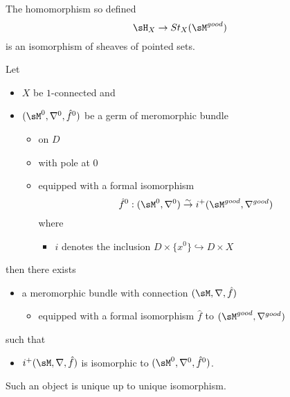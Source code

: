 \begin{thm}
  The homomorphism so defined
  \[
    \sH_X\to St_X(\sM^{good})
  \]
  is an isomorphism of sheaves of pointed sets.
\end{thm}
\begin{cor}
  Let
  \begin{itemize}
    \item $X$ be $1$-connected and
    \item $(\sM^0,\nabla^0,\hat f^0)$ be a germ of meromorphic bundle
      \begin{itemize}
        \item on $D$
        \item with pole at $0$
        \item equipped with a formal isomorphism
          \[
            \hat f^0:(\sM^0,\nabla^0)
              \overset{\sim}{\to}
              i^+(\sM^{good},\nabla^{good})
          \]
          where
          \begin{itemize}
            \item $i$ denotes the inclusion
              $D\times\{x^0\}\hookrightarrow D\times X$
          \end{itemize}
      \end{itemize}
  \end{itemize}
  then there exists
  \begin{itemize}
    \item a meromorphic bundle with connection $(\sM,\nabla,\hat f)$
      \begin{itemize}
        \item equipped with a formal isomorphism $\hat f$ to
          $(\sM^{good},\nabla^{good})$
      \end{itemize}
  \end{itemize}
  such that
  \begin{itemize}
    \item $i^+(\sM,\nabla,\hat f)$ is isomorphic to
      $(\sM^0,\nabla^0,\hat f^0)$.
  \end{itemize}
  Such an object is unique up to unique isomorphism.
\end{cor}

